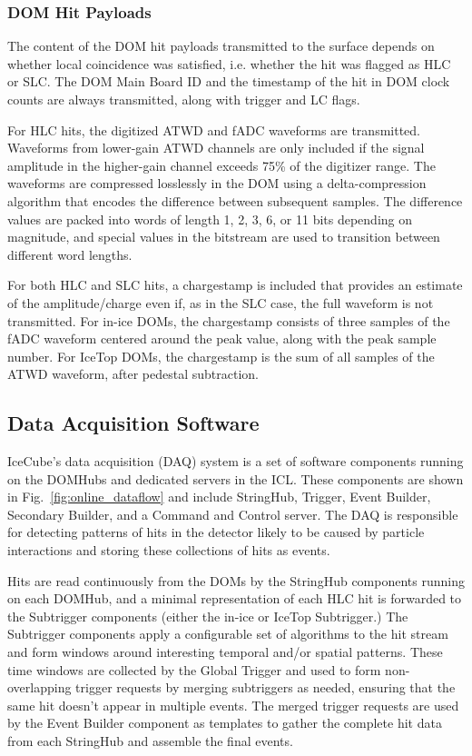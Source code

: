 \subsubsection{\label{sect:online:payloads}DOM Hit Payloads}

The content of the DOM hit payloads transmitted to the surface depends on whether local
coincidence was satisfied, i.e. whether the hit was flagged as HLC or SLC.
The DOM Main Board ID and the timestamp of the hit in DOM clock counts are
always transmitted, along with trigger and LC flags.

For HLC hits, the digitized ATWD and fADC waveforms are transmitted.
Waveforms from lower-gain ATWD channels are only included if the signal
amplitude in the higher-gain channel exceeds 75\% of the digitizer range.  The waveforms are
compressed losslessly in the DOM using a delta-compression algorithm that
encodes the difference between subsequent samples.  The difference values
are packed into words of length 1, 2, 3, 6, or 11 bits depending on
magnitude, and special values in the bitstream are used to transition
between different word lengths.

For both HLC and SLC hits, a chargestamp is included that provides an
estimate of the amplitude/charge even if, as in the SLC case, the full
waveform is not transmitted.  For in-ice DOMs, the chargestamp consists of
three samples of the fADC waveform centered around the peak value, along
with the peak sample number.  For IceTop DOMs, the chargestamp is the sum
of all samples of the ATWD waveform, after pedestal subtraction.

\subsection{Data Acquisition Software}

IceCube's data acquisition (DAQ) system is a set of software components
running on the DOMHubs and dedicated servers in the ICL.  These components are shown in
Fig.~\ref{fig:online_dataflow} and include StringHub, Trigger, Event
Builder, Secondary Builder, and a Command and Control server.  The DAQ is
responsible for detecting patterns of hits in the detector likely to be
caused by particle interactions and storing these collections of hits as
events.

Hits are read continuously from the DOMs by the
StringHub components running on each DOMHub, and a minimal representation of each HLC hit is
forwarded to the Subtrigger components (either the in-ice or IceTop Subtrigger.)
The Subtrigger components apply a
configurable set of algorithms to the hit stream and form windows around interesting temporal
and/or spatial patterns.  These time windows are collected by the
Global Trigger and used to form non-overlapping trigger requests by merging
subtriggers as needed, ensuring that the same hit doesn't appear in
multiple events.  The merged trigger requests are used by the Event Builder
component as templates 
to gather the complete hit data from each StringHub and assemble the final
events.

